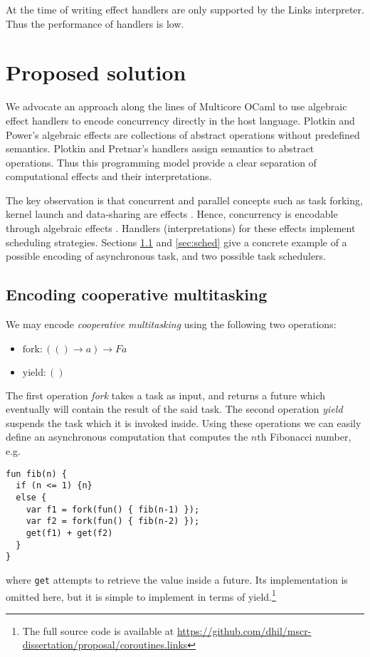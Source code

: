 \documentclass[preprint,10pt,numbers]{sigplanconf}
\begin{document}
At the time of writing effect handlers are only supported by the Links interpreter. Thus the performance of handlers is low.

  \section{Proposed solution}\label{sec:proposedsolution}
We advocate an approach along the lines of Multicore OCaml to use algebraic effect handlers to encode concurrency directly in the host language. Plotkin and Power's algebraic effects \cite{Plotkin2001} are collections of abstract operations without predefined semantics. Plotkin and Pretnar's handlers \cite{Plotkin2013} assign semantics to abstract operations. Thus this programming model provide a clear separation of computational effects and their interpretations.

The key observation is that concurrent and parallel concepts such as task forking, kernel launch and data-sharing are effects \cite{Bauer2015,Dolan2015}. Hence, concurrency is encodable through algebraic effects \cite{Bauer2015,Dolan2015}. Handlers (interpretations) for these effects implement scheduling strategies. Sections \ref{sec:eff} and \ref{sec:sched} give a concrete example of a possible encoding of asynchronous task, and two possible task schedulers.

\subsection{Encoding cooperative multitasking}\label{sec:eff}
We may encode \emph{cooperative multitasking} using the following two operations:
\begin{itemize}
  \item $\text{fork} : (() \to a) \to F a$
  \item $\text{yield} : ()$
\end{itemize}
The first operation \emph{fork} takes a task as input, and returns a future which eventually will contain the result of the said task. The second operation \emph{yield} suspends the task which it is invoked inside. Using these operations we can easily define an asynchronous computation that computes the $n$th Fibonacci number, e.g. 
\begin{lstlisting}[style={links},caption={}]
fun fib(n) {
  if (n <= 1) {n}
  else {
    var f1 = fork(fun() { fib(n-1) });
    var f2 = fork(fun() { fib(n-2) });
    get(f1) + get(f2)
  }
}
\end{lstlisting}
where \texttt{get} attempts to retrieve the value inside a future. Its implementation is omitted here, but it is simple to implement in terms of yield.\footnote{The full source code is available at \url{https://github.com/dhil/mscr-dissertation/proposal/coroutines.links}} 
\end{document}
